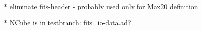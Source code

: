 

* eliminate fits-header - probably used only for Max20 definition

* NCube is in testbranch: fits_io-data.ad? 

